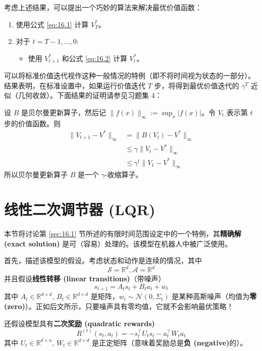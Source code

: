 考虑上述结果，可以提出一个巧妙的算法来解决最优价值函数：

\begin{enumerate}
    \item 使用公式 \eqref{eq:16.1} 计算 $V_T^*$。
    \item 对于 $t = T-1, \dots, 0$:
    \begin{itemize}
        \item[] 使用 $V_{t+1}^*$ 和公式 \eqref{eq:16.2} 计算 $V_t^*$。
    \end{itemize}
\end{enumerate}

\begin{sidenote*}
    可以将标准价值迭代视作这种一般情况的特例（即不将时间视为状态的一部分）。结果表明，在标准设置中，如果运行价值迭代 $T$ 步，将得到最优价值迭代的 $\gamma^T$ 近似（几何收敛）。下面结果的证明请参见习题集 4：
\end{sidenote*}

\begin{theorem*}
    设 $B$ 是贝尔曼更新算子，然后记 $\|f(x)\|_\infty := \sup_x |f(x)|$。令 $V_t$ 表示第 $t$ 步的价值函数。则
    \begin{align*}
        \|V_{t+1} - V^*\|_\infty 
        &= \|B(V_{t}) - V^*\|_\infty\\
        &\le \gamma \|V_{t} - V^*\|_\infty\\
        &\le \gamma^t \|V_1 - V^*\|_\infty
    \end{align*}
    所以贝尔曼更新算子 $B$ 是一个 $\gamma$-收缩算子。
\end{theorem*}


\section{线性二次调节器 (LQR)}

本节将讨论第 \ref{sec:16.1} 节所述的有限时间范围设定中的一个特例，其\textbf{精确解 (exact solution)} 是可（容易）处理的。该模型在机器人中被广泛使用。

首先，描述该模型的假设。考虑状态和动作是连续的情况，其中
\[
    \mathcal{S} = \mathbb{R}^d, \mathcal{A} = \mathbb{R}^d
\]
并且假设\textbf{线性转移 (linear transitions)}（带噪声）
\[
    s_{t+1} = A_t s_t + B_t a_t + w_t
\]
其中 $A_t \in \mathbb{R}^{d \times d}$, $B_t \in \mathbb{R}^{d \times d}$ 是矩阵，$w_t \sim \mathcal{N}(0, \Sigma_t)$ 是某种高斯噪声（均值为\textbf{零 (zero)}）。正如后文所示，只要噪声具有零均值，它就不会影响最优策略！

还假设模型具有\textbf{二次奖励 (quadratic rewards)}
\[
    R^{(t)}(s_t, a_t) = -s_t^\top U_t s_t - a_t^\top W_t a_t
\]
其中 $U_t \in \mathbb{R}^{d \times n}$, $W_t \in \mathbb{R}^{d \times d}$ 是正定矩阵（意味着奖励总是\textbf{负 (negative)}的）。

